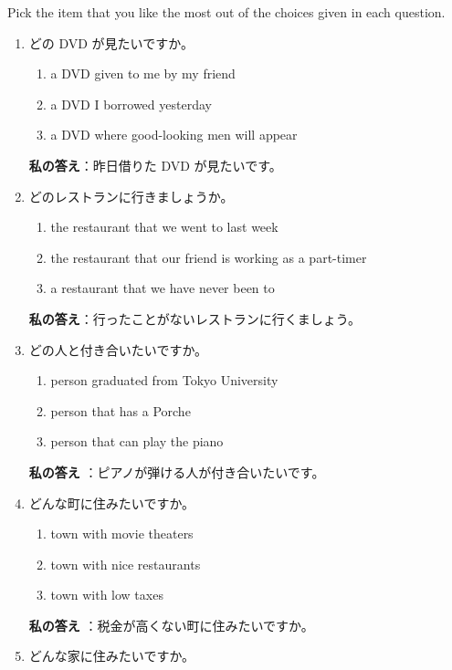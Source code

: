 \documentclass[notoc,notitlepage]{tufte-book}
\begin{document}
\begin{ex}
  Pick the item that you like the most out of the choices given in each question.

  \begin{enumerate}
    \item どの DVD が見たいですか。\\
      \begin{enumerate}
        \item a DVD given to me by my friend
        \item a DVD I borrowed yesterday
        \item a DVD where good-looking men will appear
      \end{enumerate}
      \textbf{私の答え}：昨日借りた DVD が見たいです。
    \item どのレストランに行きましょうか。\\
      \begin{enumerate}
        \item the restaurant that we went to last week
        \item the restaurant that our friend is working as a part-timer
        \item a restaurant that we have never been to
      \end{enumerate}
      \textbf{私の答え}：行ったことがないレストランに行くましょう。
    \item どの人と付き合いたいですか。\\
      \begin{enumerate}
        \item person graduated from Tokyo University
        \item person that has a Porche
        \item person that can play the piano
      \end{enumerate}
      \textbf{私の答え} ：ピアノが弾ける人が付き合いたいです。
    \item どんな町に住みたいですか。\\
      \begin{enumerate}
        \item town with movie theaters
        \item town with nice restaurants
        \item town with low taxes
      \end{enumerate}
      \textbf{私の答え} ：税金が高くない町に住みたいですか。
    \item どんな家に住みたいですか。\\

\end{enumerate}
\end{ex}
\end{document}
